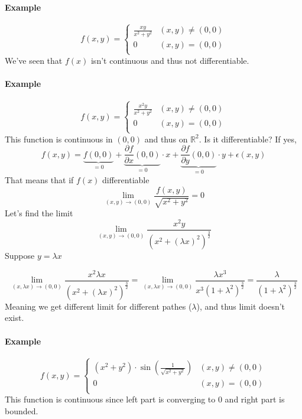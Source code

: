 \paragraph{Example}
$$f(x,y) = \begin{cases}
\frac{xy}{x^2+y^2}&(x,y)\neq (0,0)\\
0&(x,y)= (0,0)\\
\end{cases}$$
We've seen that $f(x)$ isn't continuous and thus not differentiable.
\paragraph{Example}
$$f(x,y) = \begin{cases}
\frac{x^2y}{x^2+y^2}&(x,y)\neq (0,0)\\
0&(x,y)= (0,0)\\
\end{cases}$$
This function is continuous in $(0,0)$ and thus on $\mathbb{R}^2$. Is it differentiable? If yes,
$$f(x,y) = \underbrace{f(0,0)}_{=0}+\underbrace{\frac{\partial f}{\partial x}(0,0)}_{=0}\cdot x+\underbrace{\frac{\partial f}{\partial y}(0,0)}_{=0} \cdot y + \epsilon(x,y)$$
That means that if $f(x)$ differentiable
$$\lim_{(x,y) \to (0,0)}\frac{f(x,y)}{\sqrt{x^2+y^2}} = 0$$
Let's find the limit
$$\lim_{(x,y) \to (0,0)}\frac{x^2y}{\left(x^2+\left(\lambda x\right)^2\right)^{\frac{3}{2}}} $$
Suppose $y = \lambda x$

$$\lim_{(x,\lambda x) \to (0,0)}\frac{x^2\lambda x}{\left(x^2+\left(\lambda x\right)^2\right)^{\frac{3}{2}}} = \lim_{(x,\lambda x) \to (0,0)}\frac{\lambda x^3 }{x^3\left(1+\lambda^2\right)^{\frac{3}{2}}} = \frac{\lambda }{\left(1+\lambda^2\right)^{\frac{3}{2}}}$$
Meaning we get different limit for different pathes ($\lambda$), and thus limit doesn't exist.

\paragraph{Example}
$$f(x,y) = \begin{cases}
\left(x^2+y^2\right)\cdot \sin \left(\frac{1}{\sqrt{x^2+y^2}}\right)&(x,y)\neq (0,0)\\
0&(x,y)= (0,0)\\
\end{cases}$$
This function is continuous since left part is converging to 0 and right part is bounded.

